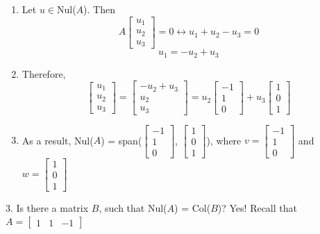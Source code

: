 \begin{enumerate}
  \item Let $u \in $Nul($A$). Then
    \[
      A\begin{bmatrix} u_1 \\ u_2 \\ u_3 \end{bmatrix} = 0 \leftrightarrow u_1 + u_2 - u_3 = 0
    \]
    \[
      u_1 = -u_2 + u_3
    \]
  \item Therefore,
    \[
      \begin{bmatrix} u_1 \\ u_2 \\ u_3 \end{bmatrix} = \begin{bmatrix} -u_2 + u_3 \\ u_2 \\ u_3 \end{bmatrix} = u_2 \begin{bmatrix} -1 \\ 1 \\ 0 \end{bmatrix} + u_3 \begin{bmatrix} 1 \\ 0 \\ 1 \end{bmatrix}
    \]
  \item As a result, Nul($A$) = span($\begin{bmatrix} -1 \\ 1 \\ 0 \end{bmatrix}$, $\begin{bmatrix} 1 \\ 0 \\ 1 \end{bmatrix}$), where $v = \begin{bmatrix} -1 \\ 1 \\ 0 \end{bmatrix}$ and $w = \begin{bmatrix} 1 \\ 0 \\ 1 \end{bmatrix}$
\end{enumerate}
3. Is there a matrix $B$, such that Nul($A$) = Col($B$)?
Yes! Recall that $A = \begin{bmatrix} 1 & 1 & -1 \end{bmatrix}$
